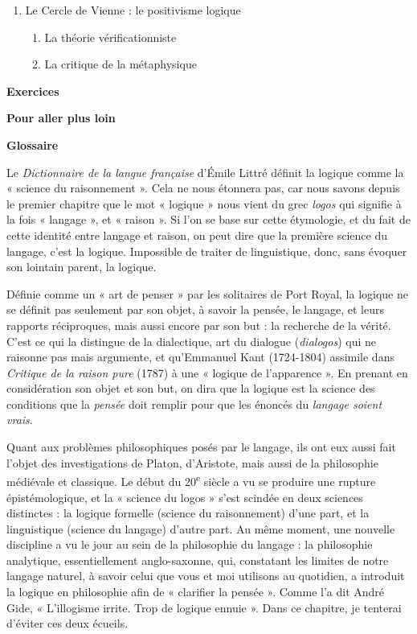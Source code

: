 \begin{keybox}
\begin{enumerate}[label=\arabic*.]
\begin{enumerate}[label=\textcircled{\scriptsize\arabic*}]
\end{enumerate}
\item Le Cercle de Vienne : le positivisme logique
\begin{enumerate}[label=\textcircled{\scriptsize\arabic*}]
\item La théorie vérificationniste
\item La critique de la métaphysique
\end{enumerate}
\end{enumerate}
\textbf{Exercices}\par
\textbf{Pour aller plus loin}\par
\textbf{Glossaire}
\end{keybox}
\clearpage
{}
Le \textit{Dictionnaire de la langue française} d’Émile Littré définit la logique comme la « science du raisonnement ». Cela ne nous étonnera pas, car nous savons depuis le premier chapitre que le mot « logique » nous vient du grec \textit{logos} qui signifie à la fois « langage », et « raison ». Si l’on se base sur cette étymologie, et du fait de cette identité entre langage et raison, on peut dire que la première science du langage, c’est la logique. Impossible de traiter de linguistique, donc, sans évoquer son lointain parent, la logique.

Définie comme un « art de penser » par les solitaires de Port Royal, la logique ne se définit pas seulement par son objet, à savoir la pensée, le langage, et leurs rapports réciproques, mais aussi encore par son but : la recherche de la vérité. C’est ce qui la distingue de la dialectique, art du dialogue (\textit{dialogos}) qui ne raisonne pas mais argumente, et qu’Emmanuel Kant (1724-1804) assimile dans \textit{Critique de la raison pure} (1787) à une « logique de l’apparence ». En prenant en considération son objet et son but, on dira que la logique est la science des conditions que la \textit{pensée} doit remplir pour que les énoncés du \textit{langage soient vrais}.

Quant aux problèmes philosophiques posés par le langage, ils ont eux aussi fait l’objet des investigations de Platon, d’Aristote, mais aussi de la philosophie médiévale et classique. Le début du 20\textsuperscript{e} siècle a vu se produire une rupture épistémologique, et la « science du logos » s’est scindée en deux sciences distinctes : la logique formelle (science du raisonnement) d’une part, et la linguistique (science du langage) d’autre part. Au même moment, une nouvelle discipline a vu le jour au sein de la philosophie du langage : la philosophie analytique, essentiellement anglo-saxonne, qui, constatant les limites de notre langage naturel, à savoir celui que vous et moi utilisons au quotidien, a introduit la logique en philosophie afin de « clarifier la pensée ». Comme l’a dit André Gide, « L’illogisme irrite. Trop de logique ennuie ». Dans ce chapitre, je tenterai d’éviter ces deux écueils.

